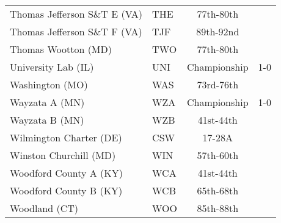 \documentclass{article}%
\begin{document}
\begin{longtable}{|ll|c|c|}
Thomas Jefferson S\&T E (VA)&THE&77th{-}80th&\\%
Thomas Jefferson S\&T F (VA)&TJF&89th{-}92nd&\\%
Thomas Wootton (MD)&TWO&77th{-}80th&\\%
University Lab (IL)&UNI&Championship&1{-}0\\%
Washington (MO)&WAS&73rd{-}76th&\\%
Wayzata A (MN)&WZA&Championship&1{-}0\\%
Wayzata B (MN)&WZB&41st{-}44th&\\%
Wilmington Charter (DE)&CSW&17{-}28A&\\%
Winston Churchill (MD)&WIN&57th{-}60th&\\%
Woodford County A (KY)&WCA&41st{-}44th&\\%
Woodford County B (KY)&WCB&65th{-}68th&\\%
Woodland (CT)&WOO&85th{-}88th&\\%
\end{longtable}%
\end{document}
